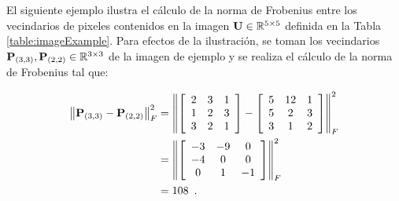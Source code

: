 El siguiente ejemplo ilustra el cálculo de la norma de Frobenius entre los vecindarios de pixeles contenidos en la imagen $\mathbf{U} \in\mathbb{R}^{5 \times 5}$ definida en la Tabla \ref{table:imageExample}. Para efectos de la ilustración, se toman los vecindarios $\mathbf{P}_{\left(3,3\right)},\mathbf{P}_{\left(2,2\right)} \in\mathbb{R}^{3\times3}$ de la imagen de ejemplo   y se realiza  el cálculo de la norma de Frobenius tal que:


\begin{equation}
\label{eq:resultado1}
\begin{split}
\left\Vert \mathbf{P}_{\left(3,3\right)}-\mathbf{P}_{\left(2,2\right)}\right\Vert_{F} ^{2} & =\left\Vert \left[\begin{array}{ccc}
2 & 3 & 1\\
1 & 2 & 3\\
3 & 2 & 1
\end{array} \right]-\left[\begin{array}{ccc}
5 & 12 & 1\\
5 & 2 & 3\\
3 & 1 & 2
\end{array}\right]\right\Vert_{F}^2 \\
& =\left\Vert\left[\begin{array}{ccc}
-3 & -9 & 0\\
-4 & 0 & 0\\
0 & 1 & -1
\end{array}\right]\right\Vert_{F}^2 \\
& =108 \enspace .
\end{split}
\end{equation}



